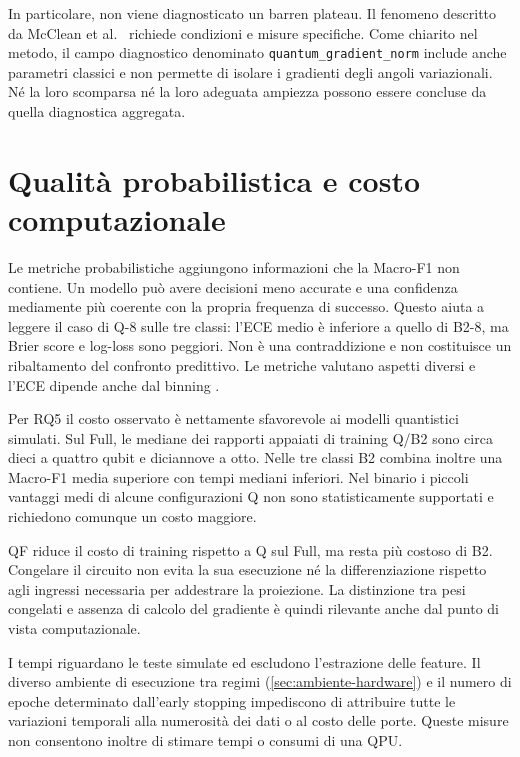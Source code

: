 In particolare, non viene diagnosticato un barren plateau. Il fenomeno
descritto da McClean et al.~\cite{mcclean2018barren} richiede condizioni
e misure specifiche. Come chiarito nel metodo, il campo diagnostico
denominato \texttt{quantum\_gradient\_norm} include anche parametri
classici e non permette di isolare i gradienti degli angoli variazionali.
Né la loro scomparsa né la loro adeguata ampiezza possono essere
concluse da quella diagnostica aggregata.

\section{Qualità probabilistica e costo computazionale}
\label{sec:disc-rq5}

Le metriche probabilistiche aggiungono informazioni che la Macro-F1
non contiene. Un modello può avere decisioni meno accurate e una
confidenza mediamente più coerente con la propria frequenza di successo.
Questo aiuta a leggere il caso di Q-8 sulle tre classi: l'ECE medio
è inferiore a quello di B2-8, ma Brier score e log-loss sono peggiori.
Non è una contraddizione e non costituisce un ribaltamento del
confronto predittivo. Le metriche valutano aspetti diversi e l'ECE
dipende anche dal binning \cite{guo2017calibration,gneiting2007scoring}.

Per RQ5 il costo osservato è nettamente sfavorevole ai modelli
quantistici simulati. Sul Full, le mediane dei rapporti appaiati
di training Q/B2 sono circa dieci a quattro qubit e diciannove a
otto. Nelle tre classi B2 combina inoltre una Macro-F1 media
superiore con tempi mediani inferiori. Nel binario i piccoli
vantaggi medi di alcune configurazioni Q non sono statisticamente
supportati e richiedono comunque un costo maggiore.

QF riduce il costo di training rispetto a Q sul Full, ma resta
più costoso di B2. Congelare il circuito non evita la sua esecuzione
né la differenziazione rispetto agli ingressi necessaria per
addestrare la proiezione. La distinzione tra pesi congelati e
assenza di calcolo del gradiente è quindi rilevante anche dal
punto di vista computazionale.

I tempi riguardano le teste simulate ed escludono l'estrazione delle
feature. Il diverso ambiente di esecuzione tra regimi
(\cref{sec:ambiente-hardware}) e il numero di epoche determinato
dall'early stopping impediscono di attribuire tutte le variazioni
temporali alla numerosità dei dati o al costo delle porte.
Queste misure non consentono inoltre di stimare tempi o consumi di una QPU.

